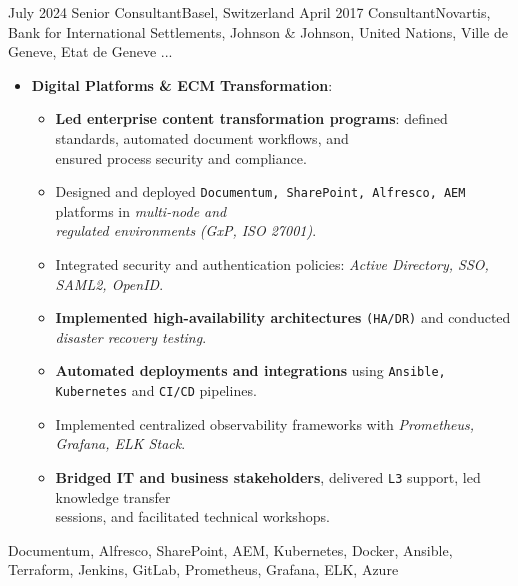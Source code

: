 
\begin{experiences}

\consultantexperience
    {July 2024} {Senior Consultant}{}{Basel, Switzerland}
    {April 2017}    {Consultant}{Novartis, Bank for International Settlements, Johnson \& Johnson, United Nations, Ville de Geneve, Etat de Geneve ...} {
        \begin{itemize}[left=0pt,label={},itemsep=0.5em]
        \vspace{0.5em}  %
          \item \textbf{Digital Platforms \& ECM Transformation}:
            \begin{itemize}[itemsep=0.2em,topsep=0.2em,parsep=0pt]
              \small              
              \item \textbf{Led enterprise content transformation programs}: defined standards, automated document workflows, and \\ ensured process security and compliance.
              \item Designed and deployed \texttt{Documentum, SharePoint, Alfresco, AEM} platforms in \emph{multi-node and \\ regulated environments} \emph{(GxP, ISO 27001)}.
              \item Integrated security and authentication policies: \emph{Active Directory, SSO, SAML2, OpenID}.
              \item \textbf{Implemented high-availability architectures} \texttt{(HA/DR)} and conducted \emph{disaster recovery testing}.
              \item \textbf{Automated deployments and integrations} using \texttt{Ansible, Kubernetes} and \texttt{CI/CD} pipelines.
              \item Implemented centralized observability frameworks with \emph{Prometheus, Grafana, ELK Stack}.
              \item \textbf{Bridged IT and business stakeholders}, delivered \texttt{L3} support, led knowledge transfer \\ sessions, and facilitated technical workshops.
            \end{itemize}
        \end{itemize}
        \vspace{0.5em}  %
    }
    {Documentum, Alfresco, SharePoint, AEM, Kubernetes, Docker, Ansible, Terraform, Jenkins, GitLab, Prometheus, Grafana, ELK, Azure}


\end{experiences}
